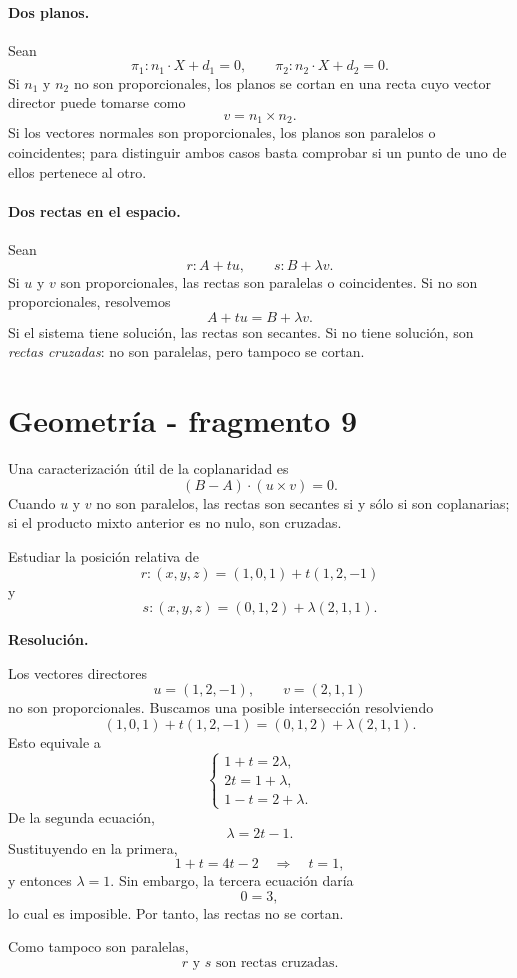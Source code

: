 \paragraph{Dos planos.}
Sean
\[
\pi_1:n_1\cdot X+d_1=0,
\qquad
\pi_2:n_2\cdot X+d_2=0.
\]
Si $n_1$ y $n_2$ no son proporcionales, los planos se cortan en una recta cuyo vector director puede tomarse como
\[
v=n_1\times n_2.
\]
Si los vectores normales son proporcionales, los planos son paralelos o coincidentes; para distinguir ambos casos basta comprobar si un punto de uno de ellos pertenece al otro.

\paragraph{Dos rectas en el espacio.}
Sean
\[
r:A+tu,
\qquad
s:B+\lambda v.
\]
Si $u$ y $v$ son proporcionales, las rectas son paralelas o coincidentes. Si no son proporcionales, resolvemos
\[
A+tu=B+\lambda v.
\]
Si el sistema tiene solución, las rectas son secantes. Si no tiene solución, son \emph{rectas cruzadas}: no son paralelas, pero tampoco se cortan.


\section{Geometría - fragmento 9}
Una caracterización útil de la coplanaridad es
\[
(B-A)\cdot(u\times v)=0.
\]
Cuando $u$ y $v$ no son paralelos, las rectas son secantes si y sólo si son coplanarias; si el producto mixto anterior es no nulo, son cruzadas.

\begin{solvedexercise}
Estudiar la posición relativa de
\[
r:(x,y,z)=(1,0,1)+t(1,2,-1)
\]
y
\[
s:(x,y,z)=(0,1,2)+\lambda(2,1,1).
\]

\textbf{Resolución.}\par\smallskip
Los vectores directores
\[
u=(1,2,-1),\qquad v=(2,1,1)
\]
no son proporcionales. Buscamos una posible intersección resolviendo
\[
(1,0,1)+t(1,2,-1)
=(0,1,2)+\lambda(2,1,1).
\]
Esto equivale a
\[
\begin{cases}
1+t=2\lambda,\\
2t=1+\lambda,\\
1-t=2+\lambda.
\end{cases}
\]
De la segunda ecuación,
\[
\lambda=2t-1.
\]
Sustituyendo en la primera,
\[
1+t=4t-2
\quad\Longrightarrow\quad
 t=1,
\]
y entonces $\lambda=1$. Sin embargo, la tercera ecuación daría
\[
0=3,
\]
lo cual es imposible. Por tanto, las rectas no se cortan.

Como tampoco son paralelas,
\[
\boxed{r\text{ y }s\text{ son rectas cruzadas}.}
\]
\end{solvedexercise}

